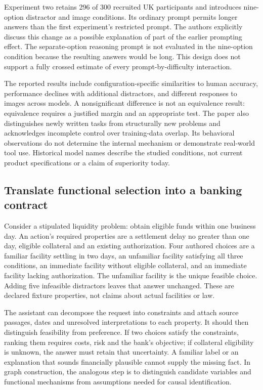Experiment two retains 296 of 300 recruited UK participants and introduces nine-option distractor and image conditions. Its ordinary prompt permits longer answers than the first experiment's restricted prompt. The authors explicitly discuss this change as a possible explanation of part of the earlier prompting effect. The separate-option reasoning prompt is not evaluated in the nine-option condition because the resulting answers would be long. This design does not support a fully crossed estimate of every prompt-by-difficulty interaction.~\citep{exec24_affordance_original}

The reported results include configuration-specific similarities to human accuracy, performance declines with additional distractors, and different responses to images across models. A nonsignificant difference is not an equivalence result: equivalence requires a justified margin and an appropriate test. The paper also distinguishes newly written tasks from structurally new problems and acknowledges incomplete control over training-data overlap. Its behavioral observations do not determine the internal mechanism or demonstrate real-world tool use. Historical model names describe the studied conditions, not current product specifications or a claim of superiority today.~\citep{exec24_affordance_original,exec24_affordance_fuzzing_reference}

\subsection{Translate functional selection into a banking contract}
Consider a stipulated liquidity problem: obtain eligible funds within one business day. An action's required properties are a settlement delay no greater than one day, eligible collateral and an existing authorization. Four authored choices are a familiar facility settling in two days, an unfamiliar facility satisfying all three conditions, an immediate facility without eligible collateral, and an immediate facility lacking authorization. The unfamiliar facility is the unique feasible choice. Adding five infeasible distractors leaves that answer unchanged. These are declared fixture properties, not claims about actual facilities or law.~\citep{exec24_affordance_fuzzing_reference}

The assistant can decompose the request into constraints and attach source passages, dates and unresolved interpretations to each property. It should then distinguish feasibility from preference. If two choices satisfy the constraints, ranking them requires costs, risk and the bank's objective; if collateral eligibility is unknown, the answer must retain that uncertainty. A familiar label or an explanation that sounds financially plausible cannot supply the missing fact. In graph construction, the analogous step is to distinguish candidate variables and functional mechanisms from assumptions needed for causal identification.~\citep{exec24_affordance_fuzzing_reference}

